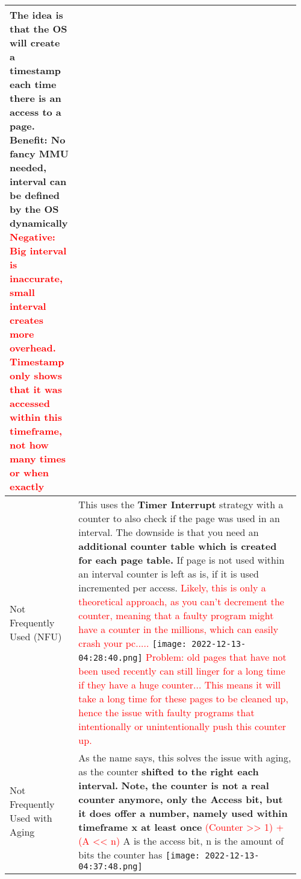 \documentclass[main.tex,fontsize=8pt,paper=a4,paper=portrait,DIV=calc,]{scrartcl}
\begin{document}
\begin{table}[ht!]
\begin{tabular}{|m{0.2\linewidth}|m{0.755\linewidth}|}
The idea is that the OS will create a timestamp each time there is an access to a page.\newline
\textcolor{OliveGreen}{Benefit: No fancy MMU needed, interval can be defined by the OS dynamically}\newline
\textcolor{red}{Negative: Big interval is inaccurate, small interval creates more overhead.\newline
Timestamp only shows that it was accessed within this timeframe, not how many times or when exactly}\\
\hline
Not Frequently Used (NFU) & 
This uses the \textbf{Timer Interrupt} strategy with a counter to also check if the page was used in an interval.\newline
The downside is that you need an \textbf{additional counter table which is created for each page table.}\newline
If page is not used within an interval counter is left as is, if it is used incremented per access.\newline
\textcolor{red}{Likely, this is only a theoretical approach, as you can't decrement the counter, meaning that a faulty program might have a counter in the millions, which can easily crash your pc.....}\newline
\texttt{[image: 2022-12-13-04:28:40.png]}\newline 
\textcolor{red}{Problem: old pages that have not been used recently can still linger for a long time if they have a huge counter... This means it will take a long time for these pages to be cleaned up, hence the issue with faulty programs that intentionally or unintentionally push this counter up.}\\
\hline
Not Frequently Used with Aging & 
As the name says, this solves the issue with aging, as the counter \textbf{shifted to the right each interval.}\newline
\textbf{Note, the counter is not a real counter anymore, only the Access bit, but it does offer a number, namely used within timeframe x at least once}\newline
\textcolor{red}{(Counter >> 1) + (A << n)} A is the access bit, n is the amount of bits the counter has\newline
\texttt{[image: 2022-12-13-04:37:48.png]}\\
\hline
\end{tabular}
\end{table}
\pagebreak
\end{document}
